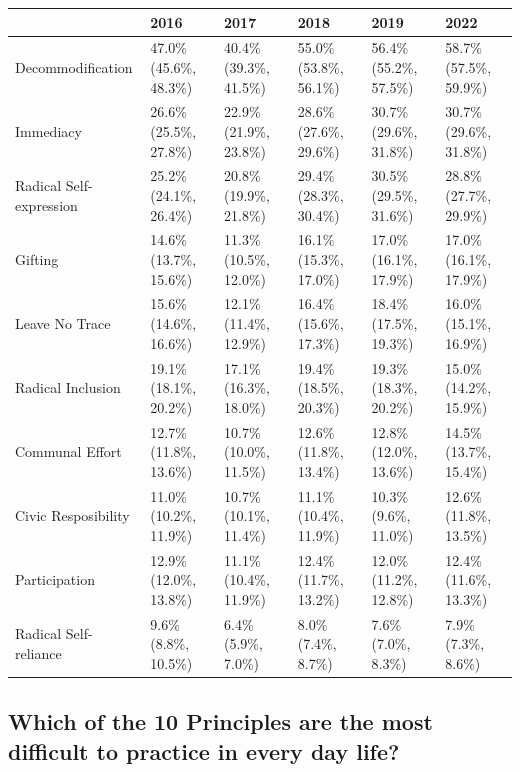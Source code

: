 \documentclass[
]{book}
\begin{document}
\begin{table}
\centering
\begin{tabular}[t]{>{}l|>{}l|>{}l|>{}l|>{}l|>{}l}
\hline
  & 2016 & 2017 & 2018 & 2019 & 2022\\
\hline
Decommodification & 47.0\% (45.6\%, 48.3\%) & 40.4\% (39.3\%, 41.5\%) & 55.0\% (53.8\%, 56.1\%) & 56.4\% (55.2\%, 57.5\%) & 58.7\% (57.5\%, 59.9\%)\\
\hline
Immediacy & 26.6\% (25.5\%, 27.8\%) & 22.9\% (21.9\%, 23.8\%) & 28.6\% (27.6\%, 29.6\%) & 30.7\% (29.6\%, 31.8\%) & 30.7\% (29.6\%, 31.8\%)\\
\hline
Radical Self-expression & 25.2\% (24.1\%, 26.4\%) & 20.8\% (19.9\%, 21.8\%) & 29.4\% (28.3\%, 30.4\%) & 30.5\% (29.5\%, 31.6\%) & 28.8\% (27.7\%, 29.9\%)\\
\hline
Gifting & 14.6\% (13.7\%, 15.6\%) & 11.3\% (10.5\%, 12.0\%) & 16.1\% (15.3\%, 17.0\%) & 17.0\% (16.1\%, 17.9\%) & 17.0\% (16.1\%, 17.9\%)\\
\hline
Leave No Trace & 15.6\% (14.6\%, 16.6\%) & 12.1\% (11.4\%, 12.9\%) & 16.4\% (15.6\%, 17.3\%) & 18.4\% (17.5\%, 19.3\%) & 16.0\% (15.1\%, 16.9\%)\\
\hline
Radical Inclusion & 19.1\% (18.1\%, 20.2\%) & 17.1\% (16.3\%, 18.0\%) & 19.4\% (18.5\%, 20.3\%) & 19.3\% (18.3\%, 20.2\%) & 15.0\% (14.2\%, 15.9\%)\\
\hline
Communal Effort & 12.7\% (11.8\%, 13.6\%) & 10.7\% (10.0\%, 11.5\%) & 12.6\% (11.8\%, 13.4\%) & 12.8\% (12.0\%, 13.6\%) & 14.5\% (13.7\%, 15.4\%)\\
\hline
Civic Resposibility & 11.0\% (10.2\%, 11.9\%) & 10.7\% (10.1\%, 11.4\%) & 11.1\% (10.4\%, 11.9\%) & 10.3\% (9.6\%, 11.0\%) & 12.6\% (11.8\%, 13.5\%)\\
\hline
Participation & 12.9\% (12.0\%, 13.8\%) & 11.1\% (10.4\%, 11.9\%) & 12.4\% (11.7\%, 13.2\%) & 12.0\% (11.2\%, 12.8\%) & 12.4\% (11.6\%, 13.3\%)\\
\hline
Radical Self-reliance & 9.6\% (8.8\%, 10.5\%) & 6.4\% (5.9\%, 7.0\%) & 8.0\% (7.4\%, 8.7\%) & 7.6\% (7.0\%, 8.3\%) & 7.9\% (7.3\%, 8.6\%)\\
\hline
\end{tabular}
\end{table}

\hypertarget{which-of-the-10-principles-are-the-most-difficult-to-practice-in-every-day-life}{%
\subsection{Which of the 10 Principles are the most difficult to practice in every day life?}\label{which-of-the-10-principles-are-the-most-difficult-to-practice-in-every-day-life}}
\end{document}
